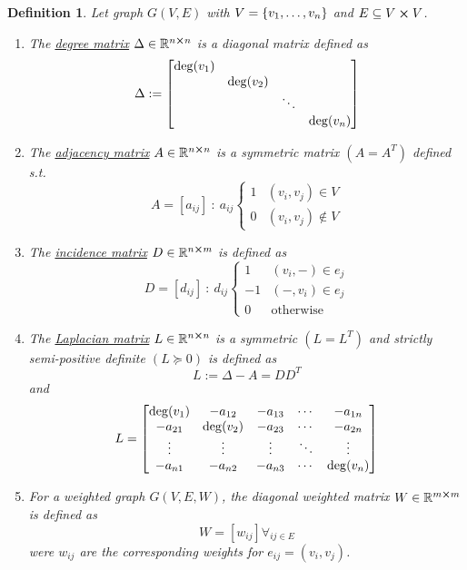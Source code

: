 \documentclass[]{article}
\numberwithin{equation}{section}
\newcommand{\R}{\mathbb{R}}
\newcommand{\st}{\ : \ }
\newtheorem{definition}{Definition}
\begin{document}
\begin{definition} \label{def:graph_matrices}
	Let graph $G(V,E)$ with $V = \qty{v_1,\dots,v_n}$ and $E \subseteq V \cross V$.
	\begin{enumerate}
		\item The \underline{\emph{degree matrix}} $\Delta \in \R^{n\cross n}$ is a diagonal matrix defined as \[
			\Delta := \mqty[\dmat{\deg(v_1), \deg(v_2), \ddots, \deg(v_n)}]
		\]
		\item The \emph{\underline{adjacency matrix}} $A \in \R^{n\cross n}$ is a symmetric matrix $(A = A^T)$ defined s.t. \[
			A = [a_{ij}] \st a_{ij} \begin{cases}
				1 &(v_i,v_j) \in V\\
				0 &(v_i,v_j) \notin V
			\end{cases}
		\]
		\item The \emph{\underline{incidence matrix}} $D \in \R^{n \cross m}$ is defined as\[
			D = [d_{ij}] \st d_{ij} \begin{cases}
				1 	&(v_i,-) \in e_{j}\\
				-1	&(-,v_i) \in e_{j}\\
				0	&\text{otherwise}
			\end{cases}
		\]
		\item The \emph{\underline{Laplacian matrix}} $L \in \R^{n \cross n}$ is a symmetric $(L = L^T)$ and strictly semi-positive definite $(L \succeq 0)$ is defined as\[
			L := \Delta - A = D D^T
		\]and\[
			L = \mqty[
				\deg(v_1)	&-a_{12}	&-a_{13}	&\cdots	&-a_{1n}\\
				-a_{21}		&\deg(v_2)	&-a_{23}	&\cdots	&-a_{2n}\\
				\vdots		&\vdots		&\vdots		&\ddots	&\vdots\\
				-a_{n1}		&-a_{n2}	&-a_{n3}	&\cdots	&\deg(v_n)
			]
		\]
		\item For a weighted graph $G(V,E,W)$, the diagonal weighted matrix $W\in \R^{m\cross m}$ is defined as\[
			W = [w_{ij}] \forall_{ij \in E}
		\]
		were $w_{ij}$ are the corresponding weights for $e_{ij} = (v_i,v_j)$.
	\end{enumerate}
\end{definition}



\end{document}
